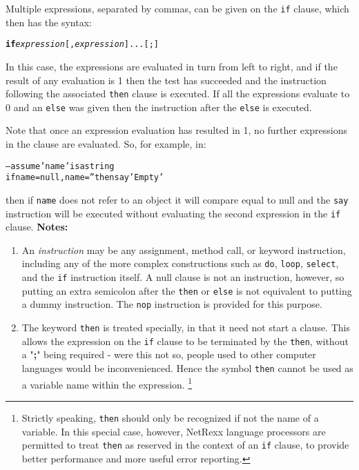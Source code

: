 Multiple expressions, separated by commas, can be given on the
\texttt{if} clause, which then has the syntax:
\begin{shaded}
\begin{alltt}
\textbf{if} \emph{expression}[, \emph{expression}]... [;]
\end{alltt}
\end{shaded}
In this case, the expressions are evaluated in turn from left to
right, and if the result of any evaluation is 1 then the test has
succeeded and the instruction following the associated \texttt{then}
clause is executed.
If all the expressions evaluate to 0 and an \texttt{else} was given
then the instruction after the \texttt{else} is executed.
 
Note that once an expression evaluation has resulted in 1, no further
expressions in the clause are evaluated.  So, for example, in:
\begin{alltt}
-- assume 'name' is a string
if name=null, name='' then say 'Empty'
\end{alltt}
then if \texttt{name} does not refer to an object it will compare equal to
null and the \texttt{say} instruction will be executed without
evaluating the second expression in the \texttt{if} clause.
 \textbf{Notes:}
\begin{enumerate}
\item An \emph{instruction} may be any assignment, method call, or
keyword instruction, including any of the more complex constructions
such as \texttt{do}, \texttt{loop}, \texttt{select}, and the \texttt{if}
instruction itself.
A null clause is not an instruction, however, so putting an extra
semicolon after the \texttt{then} or \texttt{else} is not equivalent to
putting a dummy instruction.
The \texttt{nop} instruction is provided for this purpose.
\item The keyword \texttt{then} is treated specially, in that it need not start a
clause.
This allows the expression on the \texttt{if} clause to be terminated by
the \texttt{then}, without a "\textbf{;}" being required -
were this not so, people used to other computer languages would
be inconvenienced.
Hence the symbol \texttt{then} cannot be used as a variable name within
the expression.
\footnote{
Strictly speaking, \texttt{then} should only be recognized if not
the name of a variable.  In this special case, however, NetRexx language
processors are permitted to treat \texttt{then} as reserved in the
context of an \texttt{if} clause, to provide better performance and
more useful error reporting.
}
\end{enumerate}
